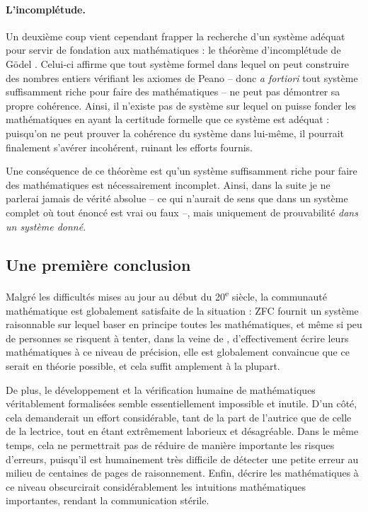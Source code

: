 \paragraph{L’incomplétude.}
Un deuxième coup vient cependant frapper la recherche d’un système adéquat pour
servir de fondation aux mathématiques : le théorème d’incomplétude de Gödel
\cite{incomplétude}. Celui-ci affirme que tout système formel dans lequel on peut
construire des nombres entiers vérifiant les axiomes de Peano – donc
\textit{a fortiori} tout système suffisamment riche pour faire des mathématiques –
ne peut pas démontrer sa propre cohérence. Ainsi, il n’existe pas de
système sur lequel on puisse fonder les mathématiques en ayant la certitude
formelle que ce système est adéquat : puisqu’on ne peut prouver la cohérence du
système dans lui-même, il pourrait finalement s’avérer incohérent, ruinant les
efforts fournis.

Une conséquence de ce théorème est qu’un système suffisamment riche
pour faire des mathématiques est nécessairement incomplet.
Ainsi, dans la suite je ne parlerai jamais de vérité absolue –
ce qui n’aurait de sens que dans un système complet
où tout énoncé est vrai ou faux –, mais
uniquement de prouvabilité \emph{dans un système donné}.

\subsection{Une première conclusion}
Malgré les difficultés mises au jour au début du 20\textsuperscript{e}
siècle, la communauté mathématique est globalement
satisfaite de la situation : ZFC fournit un système raisonnable sur
lequel baser en principe toutes les mathématiques, et même si peu de
personnes se risquent à tenter, dans la veine de \cite{Principia},
d’effectivement écrire leurs mathématiques à ce niveau de précision,
elle est globalement convaincue que ce serait en théorie
possible, et cela suffit amplement à la plupart.

De plus, le développement et la vérification humaine de mathématiques véritablement
formalisées semble essentiellement impossible et inutile.
D’un côté, cela demanderait un effort considérable,
tant de la part de l’autrice que de celle de la lectrice, tout en étant
extrêmement laborieux et désagréable.
Dans le même temps, cela ne permettrait pas de réduire de manière importante
les risques d’erreurs, puisqu’il est
humainement très difficile de détecter une petite erreur au milieu de centaines de pages de raisonnement.
Enfin, décrire les mathématiques à ce niveau obscurcirait
considérablement les intuitions mathématiques importantes,
rendant la communication stérile.

